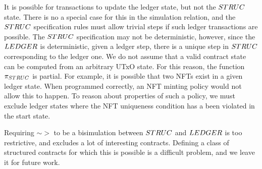 It is possible for transactions to update the ledger state, but not the $\STRUC$ state.
There is no a special case for this in the simulation relation, and the $\STRUC$
specification rules must allow trivial steps if such ledger transactions are possible.
The $\STRUC$ specification may not be deterministic, however, since the
$\LEDGER$ is deterministic, given a ledger
step, there is a unique step in $\STRUC$ corresponding to the ledger one.
We do not assume that a valid contract state can be computed from an arbitrary
UTxO state. For this reason, the function $\pi_{\STRUC}$ is partial.
For example, it is possible that two NFTs exist in a given ledger
state. When programmed correctly, an NFT minting policy would not allow this
to happen. To reason about properties of such a policy, we must exclude ledger states
where the NFT uniqueness condition has a been violated in the start state.

Requiring $\sim >$ to be a bisimulation \cite{milner-pibook} between $\STRUC$ and
$\LEDGER$ is too restrictive, and excludes a lot of interesting contracts.
Defining a class of structured contracts for which
this is possible is a difficult problem, and we leave it for future work.

